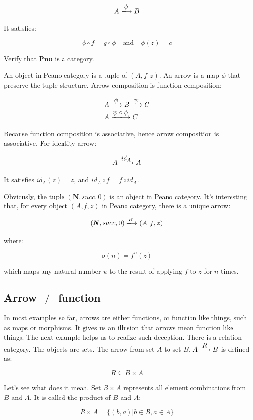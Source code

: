 \documentclass[b5paper]{article}
\begin{document}
\begin{Answer}[ref={ex:cat-definition}]
{\[
A \arrowto{\phi} B
\]

It satisfies:

\[
\phi \circ f = g \circ \phi \quad \text{and} \quad \phi(z) = c
\]

Verify that $\pmb{Pno}$ is a category.

An object in Peano category is a tuple of $(A, f, z)$. An arrow is a map $\phi$ that preserve the tuple structure. Arrow composition is function composition:

\[ \begin{array}{l}
A \arrowto{\phi} B \arrowto{\psi} C \\
A \arrowto{\psi \circ \phi} C
\end{array}\]

Because function composition is associative, hence arrow composition is associative. For identity arrow:

\[
A \arrowto{id_A} A
\]

It satisfies $id_A(z) = z$, and $id_A \circ f = f \circ id_A$.

Obviously, the tuple $(\pmb{N}, succ, 0)$ is an object in Peano category. It's interesting that, for every object $(A, f, z)$ in Peano category, there is a unique arrow:

\[
(\pmb{N}, succ, 0) \arrowto{\sigma} (A, f, z)
\]

where:

\[
\sigma(n) = f^n(z)
\]

which maps any natural number $n$ to the result of applying $f$ to $z$ for $n$ times.
}
\end{Answer}

\subsection{Arrow \texorpdfstring{$\neq$}{≠} function}

In most examples so far, arrows are either functions, or function like things, such as maps or morphisms. It gives us an illusion that arrows mean function like things. The next example helps us to realize such deception. There is a relation category. The objects are sets. The arrow from set $A$ to set $B$, $A \arrowto{R} B$ is defined as:

\[
R \subseteq B \times A
\]

Let's see what does it mean. Set $B \times A$ represents all element combinations from $B$ and $A$. It is called the product of $B$ and $A$:

\[
B \times A = \{(b, a) | b \in B, a \in A\}
\]
\end{document}
